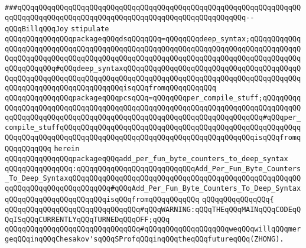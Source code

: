 \verb|###qQQqqQQqqQQqqQQqqQQqqQQqqQQqqQQqqQQqqQQqqQQqqQQqqQQqqQQqqQQqqQQqqQQqqQQqqQQqqQQqqQQqqQQqqQQqqQQqqQQqqQQqqQQqqQQqqQQqqQQqqQQq--qQQqBillqQQqJoy|\newline
\newline
\newline
\verb|stipulate|\newline
\verb|qQQqqQQqqQQqqQQqpackageqQQqdsqQQqqQQq=qQQqqQQqdeep_syntax;qQQqqQQqqQQqqQQqqQQqqQQqqQQqqQQqqQQqqQQqqQQqqQQqqQQqqQQqqQQqqQQqqQQqqQQqqQQqqQQqqQQqqQQqqQQqqQQqqQQqqQQqqQQqqQQqqQQqqQQqqQQqqQQqqQQqqQQqqQQqqQQqqQQqqQQqqQQqqQQqqQQq#qQQqdeep_syntaxqQQqqQQqqQQqqQQqqQQqqQQqqQQqqQQqqQQqqQQqqQQqqQQqqQQqqQQqqQQqqQQqqQQqqQQqqQQqqQQqqQQqqQQqqQQqqQQqqQQqqQQqqQQqqQQqqQQqqQQqqQQqqQQqqQQqqQQqqQQqisqQQqfromqQQqqQQqqQQq|\newline
\verb|qQQqqQQqqQQqqQQqpackageqQQqpcsqQQq=qQQqqQQqper_compile_stuff;qQQqqQQqqQQqqQQqqQQqqQQqqQQqqQQqqQQqqQQqqQQqqQQqqQQqqQQqqQQqqQQqqQQqqQQqqQQqqQQqqQQqqQQqqQQqqQQqqQQqqQQqqQQqqQQqqQQqqQQqqQQqqQQqqQQqqQQqqQQq#qQQqper_compile_stuffqQQqqQQqqQQqqQQqqQQqqQQqqQQqqQQqqQQqqQQqqQQqqQQqqQQqqQQqqQQqqQQqqQQqqQQqqQQqqQQqqQQqqQQqqQQqqQQqqQQqqQQqqQQqqQQqqQQqisqQQqfromqQQqqQQqqQQq|\newline
\verb|herein|\newline
\newline
\verb|qQQqqQQqqQQqqQQqpackageqQQqadd_per_fun_byte_counters_to_deep_syntax|\newline
\verb|qQQqqQQqqQQqqQQq:qQQqqQQqqQQqqQQqqQQqqQQqqQQqAdd_Per_Fun_Byte_Counters_To_Deep_SyntaxqQQqqQQqqQQqqQQqqQQqqQQqqQQqqQQqqQQqqQQqqQQqqQQqqQQqqQQqqQQqqQQqqQQqqQQqqQQqqQQq#qQQqAdd_Per_Fun_Byte_Counters_To_Deep_SyntaxqQQqqQQqqQQqqQQqqQQqqQQqisqQQqfromqQQqqQQqqQQq|\newline
\verb|qQQqqQQqqQQqqQQq{|\newline
\newline
\verb|qQQqqQQqqQQqqQQqqQQqqQQqqQQqqQQq#qQQqWARNING:qQQqTHEqQQqMAINqQQqCODEqQQqISqQQqCURRENTLYqQQqTURNEDqQQqOFF;qQQq|\newline
\verb|qQQqqQQqqQQqqQQqqQQqqQQqqQQqqQQq#qQQqqQQqqQQqqQQqqQQqweqQQqwillqQQqmergeqQQqinqQQqChesakov'sqQQqSProfqQQqinqQQqtheqQQqfutureqQQq(ZHONG).|\newline
